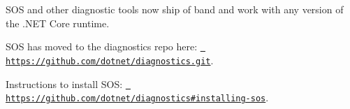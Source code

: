 S\+OS and other diagnostic tools now ship of band and work with any version of the .N\+ET Core runtime.

S\+OS has moved to the diagnostics repo here\+: \href{https://github.com/dotnet/diagnostics.git}{\texttt{ https\+://github.\+com/dotnet/diagnostics.\+git}}.

Instructions to install S\+OS\+: \href{https://github.com/dotnet/diagnostics\#installing-sos}{\texttt{ https\+://github.\+com/dotnet/diagnostics\#installing-\/sos}}. 